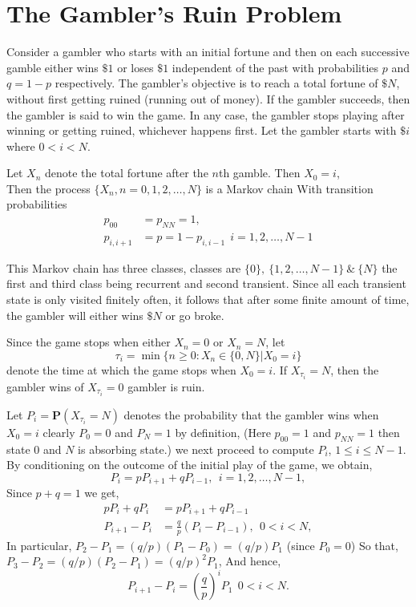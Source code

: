 \section{The Gambler's Ruin Problem}
Consider a gambler who starts with an initial fortune and then on each successive gamble
either wins $\$1$ or loses $\$1$ independent of the past with probabilities $p$ and $q = 1-p$ respectively.
The gambler's objective is to reach a total fortune of $\$N$, without first getting ruined (running out of money). If the gambler succeeds,
then the gambler is said to win the game. In any case, the gambler stops playing after winning
or getting ruined, whichever happens first. Let the gambler starts with $\$i$ where $0 < i < N$.

Let $X_{n}$ denote the total fortune after the $n$th gamble. Then $X_{0}=i$, \\
Then the process $ \{X_{n},n=0,1,2,\ldots,N\} $ is a Markov chain With 
transition probabilities
\begin{align*}
    p_{00} &= p_{N N} = 1,\\ 
    p_{i,i+1} &= p = 1-p_{i,i-1} \ \ i=1,2,\ldots,N-1
\end{align*}

This Markov chain has three classes, classes are $ \{0\},\ \{1,2,\ldots,N-1\}\ \&\ \{N\} $ the first and third class being recurrent and 
second transient. Since all each transient state is only visited finitely often, it follows that after some finite amount of time, the gambler
will either wins $ \$N $ or go broke.

Since the game stops when either $X_{n} = 0$ or $X_{n} = N$, let
\[
    \tau_{i} = \min{\{n\ge 0: X_{n}\in\{0,N\}|X_{0}=i\}} 
\]
denote the time at which the game stops when $ X_{0} = i $. If $ X_{\tau_{i}} = N $, then the gambler wins of $ X_{\tau_{i}} = 0 $ gambler is ruin.

Let $ P_{i} = \mathbf{P}(X_{\tau_{i}} = N) $ denotes the probability that the gambler wins when $ X_{0} = i $ clearly $ P_{0} = 0 $ and $ P_{N} = 1 $ 
by definition, (Here $ p_{00}=1  $ and $ p_{N N}=1 $ then state 0 and $ N $ is absorbing state.) 
we next proceed to compute $P_i$, $1 \le  i \le  N - 1$. By conditioning on the outcome of the initial play of the game, we obtain,
\[
    P_{i} = pP_{i+1} + qP_{i-1}, \ \ i=1,2,\ldots,N-1,
\]
Since $ p + q = 1 $ we get, 
\begin{align*}
    pP_{i} + qP_{i} &= pP_{i+1} + qP_{i-1}\\ 
    P_{i+1} - P_{i} &= \frac{q}{p}(P_{i}-P_{i-1}), \ \ 0<i<N,
\end{align*}
In particular, $ P_{2}-P_{1}=(q/p)(P_{1}-P_{0})=(q/p)P_{1} $ (since $ P_{0} = 0 $) So that,\\ 
$ P_{3}-P_{2}=(q/p)(P_{2}-P_{1}) = (q/p)^{2}P_{1}$, And hence,
\begin{equation*}
    P_{i+1} -P_{i} = \left( \frac{q}{p} \right)^{i}P_{1}\ \  0<i<N.
\end{equation*}

